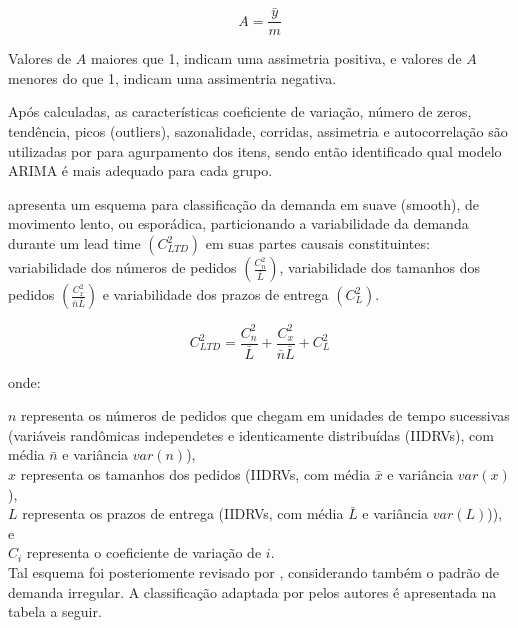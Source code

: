 \documentclass[11pt,letterpaper,twocolumn]{article}
\begin{document}
\begin{equation}
A = \frac{\bar{y}}{m}
\end{equation}

Valores de $A$ maiores que 1, indicam uma assimetria positiva, e valores de $A$ menores do que 1, indicam uma assimentria negativa.

Após calculadas, as características coeficiente de variação, número de zeros, tendência, picos (outliers), sazonalidade, corridas, assimetria e autocorrelação são utilizadas por \cite{BusingerRead1999} para agurpamento dos itens, sendo então identificado qual modelo ARIMA é mais adequado para cada grupo. 

\cite{Williams1984} apresenta um esquema para classificação da demanda em suave (smooth), de movimento lento, ou esporádica, particionando a variabilidade da demanda durante um lead time $(C_{LTD}^{2})$ em suas partes causais constituintes: variabilidade dos números de pedidos $(\frac{C_{n}^{2}}{\bar{L}})$, variabilidade dos tamanhos dos pedidos $(\frac{C_{x}^{2}}{\bar{n}\bar{L}})$ e variabilidade dos prazos de entrega $(C_{L}^{2})$. 

\begin{equation}
C_{LTD}^{2} = \frac{C_{n}^{2}}{\bar{L}} + \frac{C_{x}^{2}}{\bar{n}\bar{L}} + C_{L}^{2}
\end{equation}

onde:

$n$ representa os números de pedidos que chegam em unidades de tempo sucessivas (variáveis randômicas independetes e identicamente distribuídas (IIDRVs), com média $\bar{n}$ e variância $var(n)$), \\

$x$ representa os tamanhos dos pedidos (IIDRVs, com média $\bar{x}$ e variância $var(x)$),  \\

$L$ representa os prazos de entrega (IIDRVs, com média $\bar{L}$ e variância $var(L)$)), e \\

$C_{i}$ representa o coeficiente de variação de $i$. \\

Tal esquema foi posteriomente revisado por \cite{EavesKingsman2004}, considerando também o padrão de demanda irregular. A classificação adaptada por pelos autores é apresentada na tabela a seguir.
\end{document}
